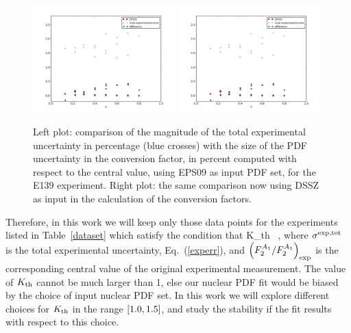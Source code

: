 \begin{figure}[t]
\begin{center}
  \includegraphics[width=0.49\textwidth]{plots/au_e139.pdf}
  \includegraphics[width=0.49\textwidth]{plots/au_e139.pdf}
\end{center}
\vspace{-0.3cm}
\caption{\small Left plot: comparison of the magnitude
  of the total experimental uncertainty in
  percentage (blue crosses)
  with the size of the PDF uncertainty in the conversion
  factor, in percent computed with respect to the
  central value, using EPS09 as input PDF set, for
  the E139 experiment.
  Right plot: the same comparison now using DSSZ as input
  in the calculation of the conversion factors.
}
\label{fig1aue139}
\end{figure}

Therefore, in this work we will keep only those data points
for the experiments listed in Table~\ref{dataset} which satisfy the
condition that
\be
\label{eq:condition}
 \le K_{\rm th} \cdot {} \,  ,
\ee
where $\sigma^{\rm exp,tot}$ is the total experimental uncertainty,
Eq.~(\ref{experr}), and   $\left( F_2^{A_1}/F_2^{A_1}\right)_{\rm exp}$ is the
corresponding central value of the original experimental measurement.
%
The value of $K_{\rm th}$ cannot be much larger than 1, else our
nuclear PDF fit would be biased by the choice of input
nuclear PDF set.
%
In this work we will explore different choices for
$K_{\rm th}$ in the range $\left[ 1.0,1.5\right]$, and study the stability
if the fit results with respect to this choice.

